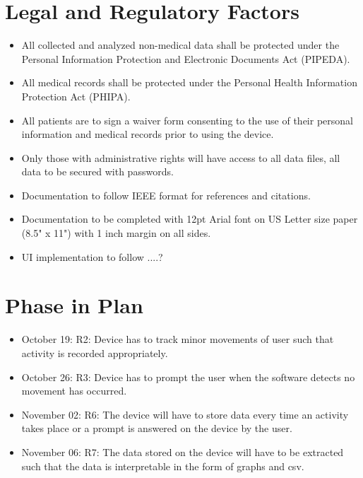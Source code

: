 \documentclass[12pt]{article}
\begin{document}
\section{Legal and Regulatory Factors}

\begin{itemize}
	\item All collected and analyzed non-medical data shall be protected under the Personal Information Protection and Electronic Documents Act (PIPEDA).
	\item All medical records shall be protected under the Personal Health Information Protection Act (PHIPA).
	\item All patients are to sign a waiver form consenting to the use of their personal information and medical records prior to using the device.
	\item Only those with administrative rights will have access to all data files, all data to be secured with passwords.
	\item Documentation to follow IEEE format for references and citations.
	\item Documentation to be completed with 12pt Arial font on US Letter size paper (8.5" x 11") with 1 inch margin on all sides.
	\item UI implementation to follow ....?
\end{itemize}

\section{Phase in Plan}

\begin{itemize}
\item October 19: R2: Device has to track minor movements of user such that activity is recorded appropriately.\\
\item October 26: R3: Device has to prompt the user when the software detects no movement has occurred.\\
\item November 02:  R6: The device will have to store data every time an activity takes place or a prompt is answered on the device by the user.\\
\item November 06:  R7: The data stored on the device will have to be extracted such that the data is interpretable in the form of graphs and csv.\\
\end{itemize}
\newpage
\end{document}
